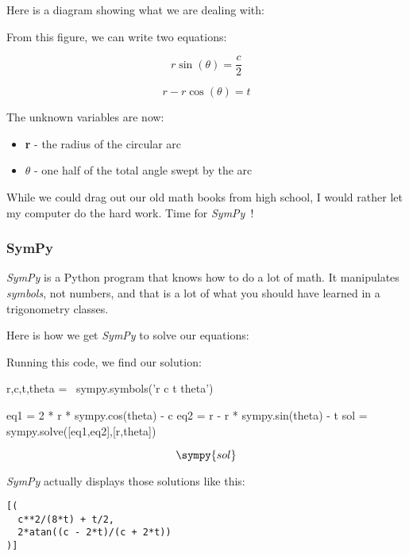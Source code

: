 Here is a diagram showing what we are dealing with:


From this figure, we can write two equations:

\begin{equation}
  {r \sin(\theta) = \frac{c}{2}}
\end{equation}

\begin{equation}
  {r - r \cos(\theta) = t}
\end{equation}

The unknown variables are now:

\begin{itemize}
  \item{{\bf r} - the radius of the circular arc}
  \item{{$ \theta $} - one half of the total angle swept by the arc}
\end{itemize}

While we could drag out our old math books from high school, I would rather let
my computer do the hard work. Time for {\it SymPy}~\cite{sympy}!

\subsubsection{SymPy}

{\it SymPy} is a Python program that knows how to do a lot of math. It manipulates
{\it symbols}, not numbers, and that is a lot of what you should have learned in
a trigonometry classes.

Here is how we get {\it SymPy} to solve our equations:


Running this code, we find our solution:

\begin{sympysilent}
r,c,t,theta = \
  sympy.symbols('r c t theta')

eq1 = 2 * r * sympy.cos(theta) - c
eq2 = r - r * sympy.sin(theta) - t
sol = sympy.solve([eq1,eq2],[r,theta])
\end{sympysilent}

\begin{equation}
\sympy{sol}
\end{equation}

{\it SymPy} actually displays those solutions like this:

\begin{lstlisting}
[(
  c**2/(8*t) + t/2,
  2*atan((c - 2*t)/(c + 2*t))
)]
\end{lstlisting}

